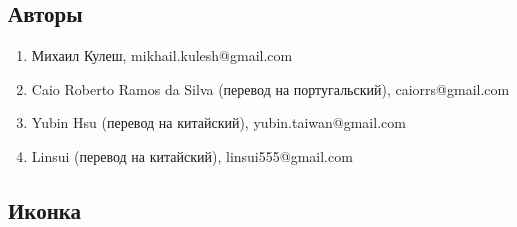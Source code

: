 \documentclass[DIV=calc, paper=a4, fontsize=11pt, twocolumn]{scrartcl}
\begin{document}
\subsection{Авторы}

\begin{enumerate}
\item Михаил Кулеш,
mikhail.kulesh@gmail.com

\item Caio Roberto Ramos da Silva
(перевод на португальский),
caiorrs@gmail.com

\item Yubin Hsu
(перевод на китайский),
yubin.taiwan@gmail.com

\item Linsui
(перевод на китайский),
linsui555@gmail.com
\end{enumerate}

\subsection{Иконка}
\end{document}
